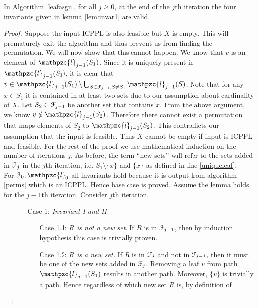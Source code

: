 \documentclass[a4paper,UKenglish,numberwithinsect]{lipics}
\def\cF{{\cal F}}
\def\cl{\mathpzc{l}}
\begin{document}
\begin{lemma}
\label{lem:invar3}
In Algorithm \ref{leafasgn}, for all $j \geq 0$, at the end of the
$j$th iteration the four invariants given in lemma \ref{lem:invar1}
are valid.  
\end{lemma}
\begin{proof}
  Suppose the input ICPPL is also feasible but $X$ is empty. This will
  prematurely exit the algorithm and thus prevent us from finding the
  permutation.  We will now show that this cannot happen. We know that
  $v$ is an element of $\cl_{j-1}(S_1)$. Since it is uniquely present
  in $\cl_{j-1}(S_1)$, it is clear that $v \in \cl_{j-1}(S_1)
  \setminus \bigcup_{S \in \cF_{j-1}, S \ne S_1}\cl_{j-1}(S)$.  Note
  that for any $x \in S_1$ it is contained in at least two sets due to
  our assumption about cardinality of $X$. Let $S_2 \in \cF_{j-1}$ be
  another set that contains $x$. From the above argument, we know $v
  \notin \cl_{j-1}(S_2)$. Therefore there cannot exist a permutation
  that maps elements of $S_2$ to $\cl_{j-1}(S_2)$. This contradicts
  our assumption that the input is feasible. Thus $X$ cannot be empty
  if input is ICPPL and feasible.
  For the rest of the proof we use mathematical induction on the
  number of iterations $j$. As before, the term ``new sets'' will
  refer to the sets added in $\cF_j$ in the $j$th iteration, i.e. $S_1
  \setminus \{x\}$ and $\{x\}$ as defined in line \ref{uniqueleaf}.\\
  For $\cF_0, \cl_0$ all invariants hold because it is output from
  algorithm \ref{perms} which is an ICPPL. Hence base case is proved.
  Assume the lemma holds for the $j-1$th iteration. Consider $j$th
  iteration. 
  \noindent
  \begin{enumerate} %
  \item []
  \begin{enumerate}
  \item [Case 1:] {\em Invariant I and II} 
    \begin{enumerate}
    \item [Case 1.1:] {\em $R$ is not a new set.} If $R$ is in
      $\cF_{j-1}$, then by induction hypothesis this case is trivially
      proven.
    \item [Case 1.2:] {\em $R$ is a new set.} If $R$ is in $\cF_{j}$
      and not in $\cF_{j-1}$, then it must be one of the new sets
      added in $\cF_j$. Removing a leaf $v$ from path $\cl_{j-1}(S_1)$
      results in another path. Moreover, $\{v\}$ is trivially a
      path. Hence regardless of which new set $R$ is, by definition of

\end{enumerate}
\end{enumerate}
\end{enumerate}
\end{proof}
\end{document}
